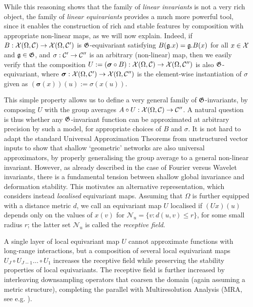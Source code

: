 While this reasoning shows that the family of {\em linear invariants} is not a very rich object, the family of {\em linear equivariants} provides a much more powerful tool, since it enables the construction of rich and stable features by composition with appropriate non-linear maps, as we will now explain. 
%
Indeed, if $B: {\mathcal{X}}(\Omega, {\mathcal{C}}) \to {\mathcal{X}}( \Omega, {\mathcal{C}}')$ is ${\mathfrak{G}}$-equivariant satisfying $B({\mathfrak{g}}.x) = {\mathfrak{g}}.B(x)$ for all $x \in {\mathcal{X}}$ and ${\mathfrak{g}} \in {\mathfrak{G}}$, and $\sigma: {\mathcal{C}}' \to {\mathcal{C}}''$ is an arbitrary (non-linear) map, then we easily verify that the composition $U := (\bm{\sigma} \circ B): {\mathcal{X}}(\Omega, {\mathcal{C}}) \to {\mathcal{X}}( \Omega, {\mathcal{C}}'')$ is also ${\mathfrak{G}}$-equivariant, where $\bm{\sigma}: {\mathcal{X}}(\Omega,{\mathcal{C}}') \to {\mathcal{X}}(\Omega, {\mathcal{C}}'')$ is the element-wise instantiation of $\sigma$ given as $(\bm{\sigma}(x))(u) := \sigma( x(u))$.

This simple property allows us to define a very general family of ${\mathfrak{G}}$-invariants, by composing $U$ with the group averages $A \circ U : {\mathcal{X}}(\Omega, {\mathcal{C}}) \to {\mathcal{C}}''$. A natural question is thus whether any ${\mathfrak{G}}$-invariant function can be approximated at arbitrary precision by such a model, for appropriate choices of $B$ and $\sigma$. 
%
It is not hard to adapt the standard Universal Approximation Theorems from unstructured vector inputs to show that shallow `geometric' networks are also universal approximators, by properly generalising the group average to a general non-linear invariant. 
%
However, as already described in the case of Fourier versus Wavelet invariants, there is a 
fundamental tension between shallow global invariance and deformation stability.
This motivates an alternative representation, which considers instead \emph{localised} equivariant maps. 
Assuming that $\Omega$ is further equipped with a distance metric $d$, we call an equivariant map $U$ localised if $(Ux)(u)$ depends only on the values of $x(v)$ for $\mathcal{N}_u = \{v : d(u,v) \leq r\}$, for some small radius $r$; the latter set $\mathcal{N}_u$ is called the {\em receptive field}. %

A single layer of local equivariant map $U$ cannot approximate functions with long-range interactions, but a composition of several local equivariant maps $U_J \circ U_{J-1} \dots \circ U_1$ increases the receptive field  while preserving the stability properties of local equivariants. The receptive field is further increased by interleaving downsampling operators that coarsen the domain (again assuming a metric structure), completing the parallel with Multiresolution Analysis (MRA, see e.g. \cite{mallat1999wavelet}). 

